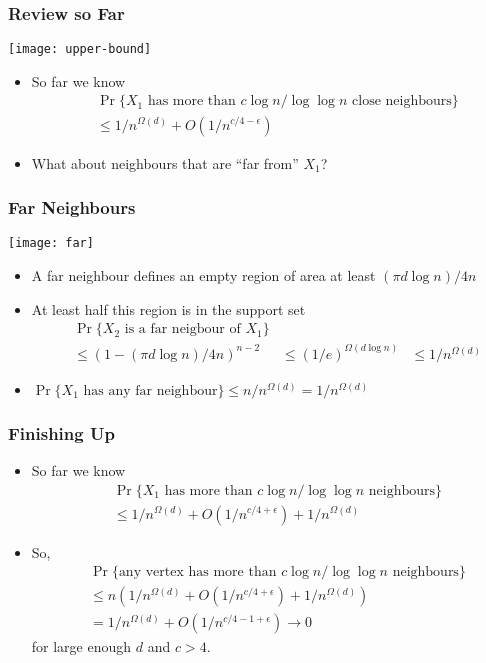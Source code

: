 \documentclass{beamer}
\begin{document}
\frame
{
  \frametitle{Review so Far}

  \begin{center}
    \texttt{[image: upper-bound]}
  \end{center}
   \begin{itemize}
     \item So far we know
       \[
         \begin{aligned}
          &\Pr\{\mbox{$X_1$ has more than $c\log n/\log\log n$ close neighbours}\} \\
          & \le 1/n^{\Omega(d)} + O(1/n^{c/4-\epsilon}) 
         \end{aligned}
       \]
     \item What about neighbours that are ``far from'' $X_1$?
   \end{itemize}
}


\frame
{
  \frametitle{Far Neighbours}

  \begin{center}
    \texttt{[image: far]}
  \end{center}
   \begin{itemize}
     \item A far neighbour defines an empty region of area at least
           $(\pi d\log n)/4n$
     \item At least half this region is in the support set
       \[
         \begin{aligned}
          &\Pr\{\mbox{$X_2$ is a far neigbour of $X_1$}\} \\
          & \le (1-(\pi d\log n)/4n)^{n-2}
          & \le (1/e)^{\Omega(d\log n)}
          & \le 1/n^{\Omega(d)}
         \end{aligned}
       \]
      \item 
       $\Pr\{\mbox{$X_1$ has any far neighbour}\} 
           \le n/n^{\Omega(d)} 
           = 1/n^{\Omega(d)}$
   \end{itemize}
}

\frame
{
  \frametitle{Finishing Up}

   \begin{itemize}
     \item So far we know
       \[
         \begin{aligned}
          &\Pr\{\mbox{$X_1$ has more than $c\log n/\log\log n$ neighbours}\} \\
          & \le 1/n^{\Omega(d)} + O(1/n^{c/4+\epsilon}) + 1/n^{\Omega(d)}  
         \end{aligned}
       \]
     \item So,
       \[
         \begin{aligned}
          &\Pr\{\mbox{any vertex has more than $c\log n/\log\log n$ neighbours}\} \\
          & \le n(1/n^{\Omega(d)} + O(1/n^{c/4+\epsilon}) + 1/n^{\Omega(d)}) \\
          & = 1/n^{\Omega(d)} + O(1/n^{c/4-1+\epsilon}) \rightarrow 0
         \end{aligned}
       \]
      for large enough $d$ and $c>4$.
   \end{itemize}
}
\end{document}
